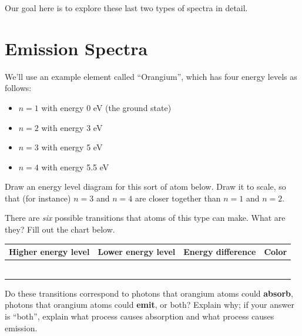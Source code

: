\documentclass[11pt]{article}
\begin{document}
Our goal here is to explore these last two types of spectra in detail. 




\newpage
\section{Emission Spectra}

We'll use an example element called ``Orangium'', which has four energy levels as follows:

\begin{itemize}
	\setlength\itemsep{0in}
	\item $n=1$ with energy 0 eV (the ground state)
	\item $n=2$ with energy 3 eV 
	\item $n=3$ with energy 5 eV 
	\item $n=4$ with energy 5.5 eV 
\end{itemize}



Draw an energy level diagram for this sort of atom below. Draw it to scale, so that (for instance) $n=3$ and $n=4$ are closer together than $n=1$ and $n=2$. 

\vspace{2.6in}

There are {\it six} possible transitions that atoms of this type can make. What are they? Fill out the chart below.

\begin{center}
	
	\Large

\begin{tabular}{|c|c|c|c|}
	\hline
	\normalsize Higher energy level &\normalsize Lower energy level & \normalsize Energy difference & \normalsize\hspace{1cm}Color\hspace{1cm} \\
	\hline
	& & & \\
	\hline
		& & & \\
	\hline
			& & & \\
	\hline
			& & & \\
	\hline
			& & & \\
	\hline
			& & & \\
	\hline
\end{tabular}
\end{center}

Do these transitions correspond to photons that orangium atoms could {\bf absorb}, photons that orangium atoms could {\bf emit}, or both? Explain why; if your answer is ``both'', explain what process causes absorption and what process causes emission.
\end{document}
